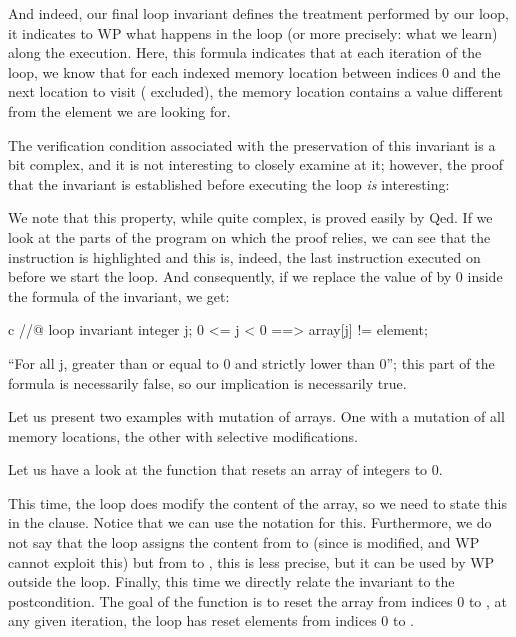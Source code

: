 And indeed, our final loop invariant defines the treatment performed by our
loop, it indicates to WP what happens in the loop (or more precisely: what we
learn) along the execution. Here, this formula indicates that at each iteration
of the loop, we know that for each indexed memory location between indices 0 and the next
location to visit ( excluded), the memory location contains a
value different from the element we are looking for.


The verification condition associated with the preservation of this invariant is
a bit complex, and it is not interesting to closely examine at it;
however, the proof that the invariant is established before
executing the loop \emph{is} interesting:




We note that this property, while quite complex, is proved easily
by Qed. If we look at the parts of the program on which the proof
relies, we can see that the instruction  is highlighted
and this is, indeed, the last instruction executed on  before
we start the loop. And consequently, if we replace the value of
 by 0 inside the formula of the invariant, we get:


\begin{CodeBlock}{c}
//@ loop invariant \forall integer j; 0 <= j < 0 ==> array[j] != element;
\end{CodeBlock}


``For all j, greater than or equal to 0 and strictly lower than 0''; this
part of the formula is necessarily false, so our implication is
necessarily true.




Let us present two examples with mutation of arrays. One with a mutation
of all memory locations, the other with selective modifications.




Let us have a look at the function that resets an array of integers to 0.




This time, the loop does modify the content of the array, so we need to
state this in the  clause. Notice that we can use
the notation  for this. Furthermore, we do not say that
the loop assigns the content from  to  (since
 is modified, and WP cannot exploit this) but from 
to , this is less precise, but it can be used by WP outside the
loop. Finally, this time we directly relate the invariant to the postcondition.
The goal of the function is to reset the array from indices 0 to , at
any given iteration, the loop has reset elements from indices 0 to .


